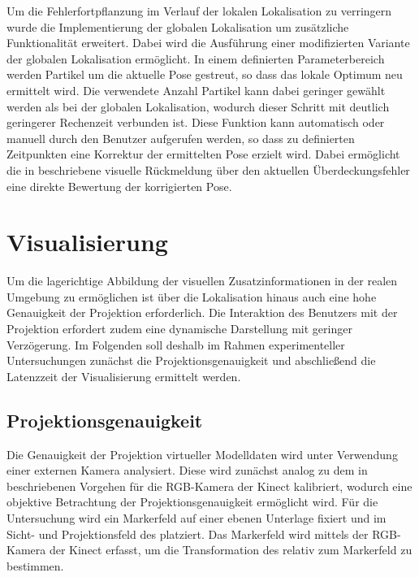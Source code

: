 Um die Fehlerfortpflanzung im Verlauf der lokalen Lokalisation zu verringern wurde die Implementierung der globalen Lokalisation um zusätzliche Funktionalität erweitert. Dabei wird die Ausführung einer modifizierten Variante der globalen Lokalisation ermöglicht. In einem definierten Parameterbereich werden Partikel um die aktuelle Pose gestreut, so dass das lokale Optimum neu ermittelt wird. Die verwendete Anzahl Partikel kann dabei geringer gewählt werden als bei der globalen Lokalisation, wodurch dieser Schritt mit deutlich geringerer Rechenzeit verbunden ist. Diese Funktion kann automatisch oder manuell durch den Benutzer aufgerufen werden, so dass zu definierten Zeitpunkten eine Korrektur der ermittelten Pose erzielt wird. Dabei ermöglicht die in  beschriebene visuelle Rückmeldung über den aktuellen Überdeckungsfehler eine direkte Bewertung der korrigierten Pose.


\prever{
}



\section{Visualisierung}
Um die lagerichtige Abbildung der visuellen Zusatzinformationen in der realen Umgebung zu ermöglichen ist über die Lokalisation hinaus auch eine hohe Genauigkeit der Projektion erforderlich. Die Interaktion des Benutzers mit der Projektion erfordert zudem eine dynamische Darstellung mit geringer Verzögerung. Im Folgenden soll deshalb im Rahmen experimenteller Untersuchungen zunächst die Projektionsgenauigkeit und abschließend die Latenzzeit der Visualisierung ermittelt werden.

\subsection{Projektionsgenauigkeit}
Die Genauigkeit der Projektion virtueller Modelldaten wird unter Verwendung einer externen Kamera analysiert. Diese wird zunächst analog zu dem in  beschriebenen Vorgehen für die RGB-Kamera der Kinect kalibriert, wodurch eine objektive Betrachtung der Projektionsgenauigkeit ermöglicht wird. Für die Untersuchung wird ein Markerfeld auf einer ebenen Unterlage fixiert und im Sicht- und Projektionsfeld des  platziert. Das Markerfeld wird mittels der RGB-Kamera der Kinect erfasst, um die Transformation des  relativ zum Markerfeld zu bestimmen.\\

